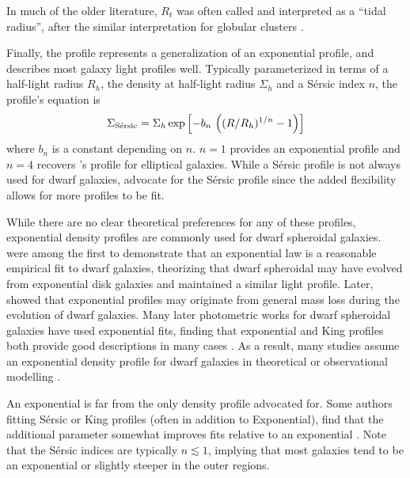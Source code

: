 In much of the older literature, \(R_t\) was often called and
interpreted as a ``tidal radius'', after the similar interpretation for
globular clusters \citep[e.g.,][\citet{hodge1961}]{IH1995}.

Finally, the \citet{sersic1963} profile represents a generalization of
an exponential profile, and describes most galaxy light profiles well.
Typically parameterized in terms of a half-light radius \(R_h\), the
density at half-light radius \(\Sigma_h\) and a Sérsic index \(n\), the
profile's equation is \begin{equation}{
\Sigma_{\rm S\acute ersic} = \Sigma_h \exp\left[-b_n \,  \left((R/R_h)^{1/n} - 1\right)\right]
}\end{equation} where \(b_n\) is a constant depending on \(n\). \(n=1\)
provides an exponential profile and \(n=4\) recovers
\citet{devaucouleurs1948}'s profile for elliptical galaxies. While a
Sérsic profile is not always used for dwarf galaxies, \citet{munoz+2018}
advocate for the Sérsic profile since the added flexibility allows for
more profiles to be fit.

While there are no clear theoretical preferences for any of these
profiles, exponential density profiles are commonly used for dwarf
spheroidal galaxies. \citet{faber+lin1983} were among the first to
demonstrate that an exponential law is a reasonable empirical fit to
dwarf galaxies, theorizing that dwarf spheroidal may have evolved from
exponential disk galaxies and maintained a similar light profile. Later,
\citet{read+gilmore2005} showed that exponential profiles may originate
from general mass loss during the evolution of dwarf galaxies. Many
later photometric works for dwarf spheroidal galaxies have used
exponential fits, finding that exponential and King profiles both
provide good descriptions in many cases
\citetext{\citealp[\citet{mateo1998}]{binggeli+sandage+tarenghi1984}; \citealp{mcconnachie+irwin2006}; \citealp{cicuendez+2018}}.
As a result, many studies assume an exponential density profile for
dwarf galaxies in theoretical or observational modelling
\citetext{\citealp[e.g.,][
\citet{MV2020a}]{martin+2016}; \citealp{battaglia+2022}; \citealp[ but
is for disk]{kowalczyk+2013}}.

An exponential is far from the only density profile advocated for. Some
authors fitting Sérsic or King profiles (often in addition to
Exponential), find that the additional parameter somewhat improves fits
relative to an exponential
\citep{IH1995, vanzee+barton+skillman2004, munoz+2018, wang+2019}. Note
that the Sérsic indices are typically \(n \lesssim 1\), implying that
most galaxies tend to be an exponential or slightly steeper in the outer
regions.

